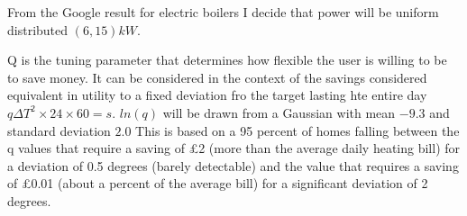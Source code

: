 \documentclass[11pt]{article}
\begin{document}
From the Google result for electric boilers I decide that power will be uniform distributed $(6,15)kW$.

Q is the tuning parameter that determines how flexible the user is willing to be to save money. It can be considered in the context of the savings considered equivalent in utility to a fixed deviation fro the target lasting hte entire day $q \Delta T^{2} \times 24 \times 60 = s$. $ln(q)$ will be drawn from a Gaussian with mean $-9.3$ and standard deviation $2.0$ This is based on a 95 percent of homes falling between the q values that require a saving of £2 (more than the average daily heating bill) for a deviation of 0.5 degrees (barely detectable)  and the value that requires a saving of £0.01 (about a percent of the average bill) for a significant deviation of 2 degrees.
{}

\end{document}
